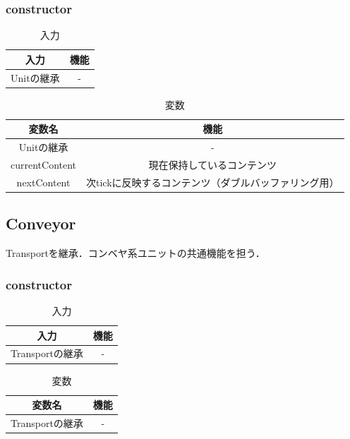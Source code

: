 \documentclass[uplatex,dvipdfmx,report]{jlreq}
\begin{document}
\subsubsection{constructor}

\begin{table}[H]
    \centering
    \caption{入力}
    \begin{tabular}{cc}
        \hline
        入力 & 機能 \\
        \hline
        \hline
        Unitの継承 & - \\
        \hline
    \end{tabular}
\end{table}

\begin{table}[H]
    \centering
    \caption{変数}
    \begin{tabular}{cc}
        \hline
        変数名 & 機能 \\
        \hline
        \hline
        Unitの継承 & - \\
        currentContent & 現在保持しているコンテンツ \\
        nextContent & 次tickに反映するコンテンツ（ダブルバッファリング用） \\
        \hline
    \end{tabular}
\end{table}

\subsection{Conveyor}

Transportを継承．コンベヤ系ユニットの共通機能を担う．

\subsubsection{constructor}

\begin{table}[H]
    \centering
    \caption{入力}
    \begin{tabular}{cc}
        \hline
        入力 & 機能 \\
        \hline
        \hline
        Transportの継承 & - \\
        \hline
    \end{tabular}
\end{table}

\begin{table}[H]
    \centering
    \caption{変数}
    \begin{tabular}{cc}
        \hline
        変数名 & 機能 \\
        \hline
        \hline
        Transportの継承 & - \\
        \hline
    \end{tabular}
\end{table}
\end{document}
